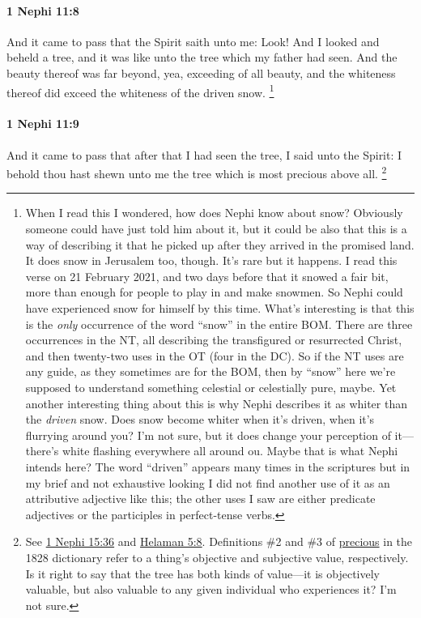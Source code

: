 		\paragraph{1 Nephi 11:8} %
			\label{1NEPHI-11-8}

			And it came to pass that the Spirit saith unto me: Look!
			And I looked and beheld a tree,
			and it was like unto the tree which my father had seen.
			And the beauty thereof was far beyond, yea, exceeding of all beauty,
			and the whiteness thereof did exceed the whiteness of the driven snow.%
				\footnote{%
					\label{1NEPHI-11-8-NOTE-snow}%
					When I read this I wondered, how does Nephi know about snow? Obviously someone could have just told him about it, but it could be also that this is a way of describing it that he picked up after they arrived in the promised land. It does snow in Jerusalem too, though. It's rare but it happens. I read this verse on 21 February 2021, and two days before that it snowed a fair bit, more than enough for people to play in and make snowmen. So Nephi could have experienced snow for himself by this time. What's interesting is that this is the \textit{only} occurrence of the word ``snow'' in the entire BOM. There are three occurrences in the NT, all describing the transfigured or resurrected Christ, and then twenty-two uses in the OT (four in the DC). So if the NT uses are any guide, as they sometimes are for the BOM, then by ``snow'' here we're supposed to understand something celestial or celestially pure, maybe. Yet another interesting thing about this is why Nephi describes it as whiter than the \textit{driven} snow. Does snow become whiter when it's driven, when it's flurrying around you? I'm not sure, but it does change your perception of it---there's white flashing everywhere all around ou. Maybe that is what Nephi intends here? The word ``driven'' appears many times in the scriptures but in my brief and not exhaustive looking I did not find another use of it as an attributive adjective like this; the other uses I saw are either predicate adjectives or the participles in perfect-tense verbs.
					}

		\paragraph{1 Nephi 11:9} %
			\label{1NEPHI-11-9}

			And it came to pass that after that I had seen the tree,
			I said unto the Spirit:
			I behold thou hast shewn unto me the tree
			which is most precious above all.%
				\footnote{%
					\label{1NEPHI-11-9-NOTE-precious}%
					See \hyperref[1NEPHI-15-36]{1 Nephi 15:36} and \hyperref[HELAMAN-5-8]{Helaman 5:8}. Definitions \#2 and \#3 of \hyperref[PRECIOUS-1828]{precious} in the 1828 dictionary refer to a thing's objective and subjective value, respectively. Is it right to say that the tree has both kinds of value---it is objectively valuable, but also valuable to any given individual who experiences it? I'm not sure. 
					}

